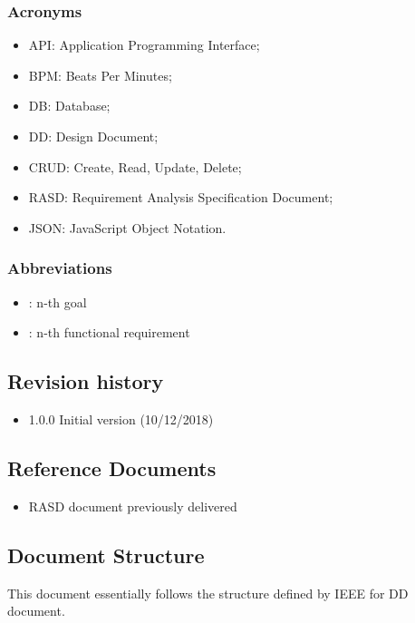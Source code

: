 \documentclass[DD.tex]{subfiles}
\begin{document}
\subsubsection{Acronyms}
\begin{itemize}
	\item API: Application Programming Interface;
	\item BPM: Beats Per Minutes;
	\item DB: Database;
	\item DD: Design Document;
	\item CRUD: Create, Read, Update, Delete;
	\item RASD: Requirement Analysis Specification Document;
	\item JSON: JavaScript Object Notation.
\end{itemize}

\subsubsection{Abbreviations}
\begin{itemize}
	\item \begin{math}[Gn]\end{math}: n-th goal
	\item \begin{math}[Rn]\end{math}: n-th functional requirement
\end{itemize}

\subsection{Revision history}
\begin{itemize}
		\item 1.0.0 Initial version (10/12/2018)
\end{itemize}

\subsection{Reference Documents} 
\begin{itemize}
		\item RASD document previously delivered 
\end{itemize}

\subsection{Document Structure}
This document essentially follows the structure defined by IEEE for DD document.

\newpage
\end{document}
